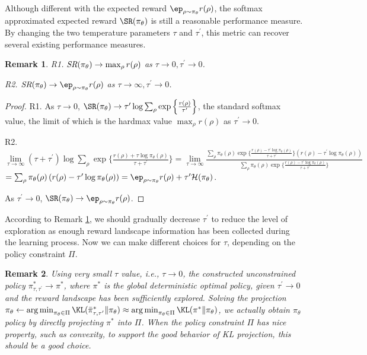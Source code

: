 \documentclass{article}
\newtheorem{remk}{Remark}
\DeclareMathOperator*{\argmin}{arg\,min}
\begin{document}
Although different with the expected reward $\ep_{\rho \sim \pi_\theta}{r(\rho)}$, the softmax approximated expected reward $\SR(\pi_\theta)$ is still a reasonable performance measure. By changing the two temperature parameters $\tau$ and $\tau^{\prime}$, this metric can recover several existing performance measures.

\begin{remk}
\label{sr_limits}
R1. $\text{\em SR}(\pi_\theta) \to \max_{\rho}{r(\rho)}$ as $\tau \to 0, \tau^{\prime} \to 0$.

R2. $\text{\em SR}(\pi_\theta) \to \ep_{\rho \sim \pi_\theta}{r(\rho)}$ as $\tau \to \infty, \tau^{\prime} \to 0$.
\end{remk}
\begin{proof}
R1. As $\tau \to 0$, $\SR(\pi_\theta) \to \tau^{\prime} \log{ \sum_{\rho}{ \exp\left\{ \frac{r(\rho) }{ \tau^{\prime} } \right\} }}$, the standard softmax value, the limit of which is the hardmax value $\max_{\rho}{r(\rho)}$ as $\tau^{\prime} \to 0$.

R2. $\lim\limits_{\tau \to \infty}{ (\tau + \tau^{\prime})\log{ \sum_{\rho}{ \exp\{ \frac{r(\rho) + \tau \log{\pi_\theta(\rho)} }{\tau + \tau^{\prime}} \} }} }
= \lim\limits_{\tau \to \infty}{ \frac{ \sum_{\rho}{ \pi_\theta(\rho) \exp\{ \frac{r(\rho) - \tau^{\prime} \log{\pi_\theta(\rho)} }{\tau + \tau^{\prime}} \} \left( r(\rho) - \tau^{\prime}\log{\pi_\theta(\rho)} \right) } }{  \sum_{\rho}{ \pi_\theta(\rho) \exp\{ \frac{r(\rho) - \tau^{\prime} \log{\pi_\theta(\rho)} }{\tau + \tau^{\prime}} \} } } }$
$= \sum_{\rho}{ \pi_\theta(\rho) \left( r(\rho) - \tau^{\prime}\log{\pi_\theta(\rho)} \right) } = \ep_{\rho \sim \pi_\theta}{r(\rho)} + \tau^{\prime} \mathcal{H}(\pi_\theta)$.

As $\tau^{\prime} \to 0$, $\SR(\pi_\theta) \to \ep_{\rho \sim \pi_\theta}{r(\rho)}$.
\end{proof}

According to Remark \ref{sr_limits}, we should gradually decrease $\tau^{\prime}$ to reduce the level of exploration as enough reward landscape information has been collected during the learning process. Now we can make different choices for $\tau$, depending on the policy constraint $\Pi$.

\begin{remk}
\label{small_tau_choices}
Using very small $\tau$ value, i.e., $\tau \to 0$, the constructed unconstrained policy $\pi_{\tau,\tau^{\prime}}^* \to \pi^*$, where $\pi^*$ is the global deterministic optimal policy, given $\tau^{\prime} \to 0$ and the reward landscape has been sufficiently explored. Solving the projection $\pi_\theta \leftarrow \argmin_{\pi_\theta \in \Pi}{\KL(\bar{\pi}_{\tau,\tau^{\prime}}^* \| \pi_\theta}) \approx \argmin_{\pi_\theta \in \Pi}{\KL(\pi^* \| \pi_\theta})$, we actually obtain $\pi_\theta$ policy by directly projecting $\pi^*$ into $\Pi$. When the policy constraint $\Pi$ has nice property, such as convexity, to support the good behavior of KL projection, this should be a good choice.
\end{remk}
\end{document}
